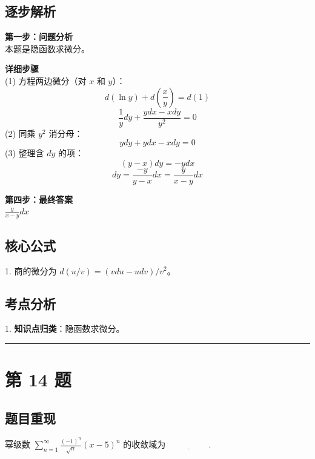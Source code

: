 \documentclass[10pt, a4paper]{ctexart}
\newcommand{\problemheader}{
    \vspace{0.5cm}
    \noindent\rule[0.5ex]{\linewidth}{2pt} %
}
\newcommand{\analysisheader}{
    \vspace{0.2cm}
    \noindent{\color{red}\rule[0.5ex]{\linewidth}{0.5pt}} %
    \vspace{0.1cm}
}
\begin{document}
\analysisheader
{\color{red}
\subsection*{逐步解析}
\textbf{第一步：问题分析} \\
本题是隐函数求微分。

\textbf{详细步骤} \\
(1) 方程两边微分（对 $x$ 和 $y$）：
\[ d(\ln y) + d\left(\frac{x}{y}\right) = d(1) \]
\[ \frac{1}{y} dy + \frac{y dx - x dy}{y^2} = 0 \]
(2) 同乘 $y^2$ 消分母：
\[ y dy + y dx - x dy = 0 \]
(3) 整理含 $dy$ 的项：
\[ (y - x) dy = -y dx \]
\[ dy = \frac{-y}{y-x} dx = \frac{y}{x-y} dx \]

\textbf{第四步：最终答案} \\
$\frac{y}{x-y} dx$

\subsection*{核心公式}
1. 商的微分为 $d(u/v) = (v du - u dv)/v^2$。

\subsection*{考点分析}
1. \textbf{知识点归类}：隐函数求微分。
}

\problemheader
\section*{第 14 题}
\subsection*{题目重现}
幂级数 $\sum\limits_{n=1}^\infty \frac{(-1)^n}{\sqrt{n}}(x-5)^n$ 的收敛域为 $\underline{\hspace{2cm}}$.
\end{document}
